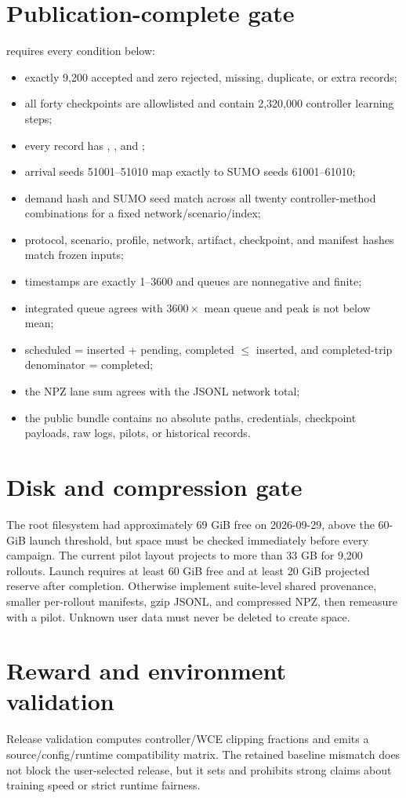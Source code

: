 \section{Publication-complete gate}
 requires every condition below:
\begin{itemize}
  \item exactly 9,200 accepted and zero rejected, missing, duplicate, or extra records;
  \item all forty checkpoints are allowlisted and contain 2,320,000 controller learning steps;
  \item every record has , , and ;
  \item arrival seeds 51001--51010 map exactly to SUMO seeds 61001--61010;
  \item demand hash and SUMO seed match across all twenty controller-method combinations for a fixed network/scenario/index;
  \item protocol, scenario, profile, network, artifact, checkpoint, and manifest hashes match frozen inputs;
  \item timestamps are exactly 1--3600 and queues are nonnegative and finite;
  \item integrated queue agrees with $3600\times$ mean queue and peak is not below mean;
  \item scheduled = inserted + pending, completed $\le$ inserted, and completed-trip denominator = completed;
  \item the NPZ lane sum agrees with the JSONL network total;
  \item the public bundle contains no absolute paths, credentials, checkpoint payloads, raw logs, pilots, or historical records.
\end{itemize}

\section{Disk and compression gate}
The root filesystem had approximately 69 GiB free on 2026-09-29, above the 60-GiB launch threshold, but space must be checked immediately before every campaign. The current pilot layout projects to more than 33 GB for 9,200 rollouts. Launch requires at least 60 GiB free and at least 20 GiB projected reserve after completion. Otherwise implement suite-level shared provenance, smaller per-rollout manifests, gzip JSONL, and compressed NPZ, then remeasure with a pilot. Unknown user data must never be deleted to create space.

\section{Reward and environment validation}
Release validation computes controller/WCE clipping fractions and emits a source/config/runtime compatibility matrix. The retained baseline mismatch does not block the user-selected release, but it sets  and prohibits strong claims about training speed or strict runtime fairness.
